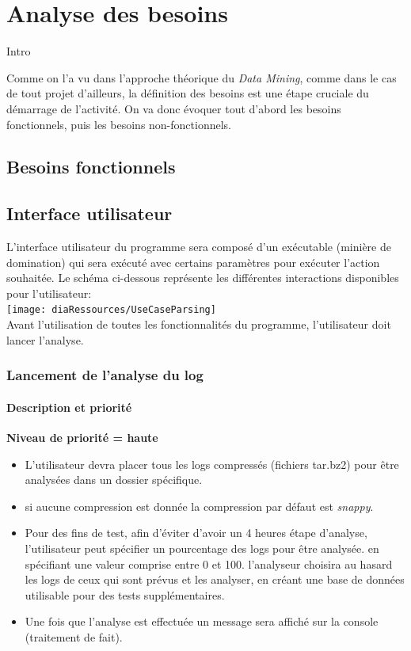 \chapter{Analyse des besoins}

Intro

Comme on l'a vu dans l'approche théorique du \textit{Data Mining}, comme dans le cas de tout projet d'ailleurs, la définition des besoins est une étape cruciale du démarrage de l'activité. On va donc évoquer tout d'abord les besoins fonctionnels, puis les besoins non-fonctionnels.


\section{Besoins fonctionnels}
\iffalse
\section{Interface utilisateur}
L'interface utilisateur du programme sera composé d'un exécutable (minière de domination) qui sera exécuté avec certains paramètres pour exécuter l'action souhaitée. Le schéma ci-dessous représente les différentes interactions disponibles pour l'utilisateur:\\

\texttt{[image: diaRessources/UseCaseParsing]}\\
Avant l'utilisation de toutes les fonctionnalités du programme, l'utilisateur doit lancer l'analyse.
\subsection{Lancement de l'analyse du log}
\subsubsection{Description et priorité}
\textbf{Niveau de priorité = haute}\\
\begin{itemize}
  \item L'utilisateur devra placer tous les logs compressés (fichiers tar.bz2) pour être analysées dans un dossier spécifique.
  \item si aucune compression est donnée la compression par défaut est \textit{snappy}.
    \item Pour des fins de test, afin d'éviter d'avoir un 4 heures étape d'analyse, l'utilisateur peut spécifier un pourcentage des logs pour être analysée. en spécifiant une valeur comprise entre 0 et 100. l'analyseur choisira au hasard les logs de ceux qui sont prévus et les analyser, en créant une base de données utilisable pour des tests supplémentaires.
    \item Une fois que l'analyse est effectuée un message sera affiché sur la console (traitement de fait).

\end{itemize}

